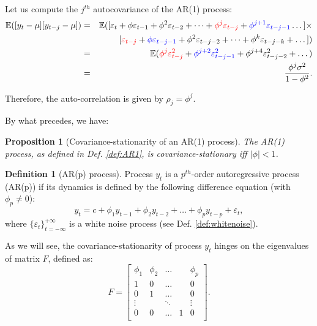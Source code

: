 \documentclass[
  11pt,
]{book}
\newtheorem{proposition}{Proposition}[chapter]
\theoremstyle{definition}
\newtheorem{definition}{Definition}[chapter]
\theoremstyle{definition}
\theoremstyle{definition}
\theoremstyle{definition}
\theoremstyle{remark}
\begin{document}
Let us compute the \(j^{th}\) autocovariance of the AR(1) process:
\begin{eqnarray*}
\mathbb{E}([y_{t} - \mu][y_{t-j} - \mu]) &=& \mathbb{E}([\varepsilon_t + \phi  \varepsilon_{t-1}+ \phi^2 \varepsilon_{t-2} + \dots + {\color{red}\phi^j \varepsilon_{t-j}} + {\color{blue}\phi^{j+1} \varepsilon_{t-j-1}} \dots]\times \\
&&[{\color{red}\varepsilon_{t-j}} + {\color{blue}\phi \varepsilon_{t-j-1}} + \phi^2 \varepsilon_{t-j-2} + \dots + \phi^k \varepsilon_{t-j-k} + \dots])\\
&=& \mathbb{E}({\color{red}\phi^j \varepsilon_{t-j}^2}+{\color{blue}\phi^{j+2} \varepsilon_{t-j-1}^2}+\phi^{j+4} \varepsilon_{t-j-2}^2+\dots)\\
&=& \frac{\phi^j \sigma^2}{1 - \phi^2}.
\end{eqnarray*}

Therefore, the auto-correlation is given by \(\rho_j = \phi^j\).

By what precedes, we have:

\begin{proposition}[Covariance-stationarity of an AR(1) process]
\protect\hypertarget{prp:statioAR1}{}\label{prp:statioAR1}The AR(1) process, as defined in Def. \ref{def:AR1}, is covariance-stationary iff \(|\phi|<1\).
\end{proposition}

\begin{definition}[AR(p) process]
\protect\hypertarget{def:ARp}{}\label{def:ARp}Process \(y_t\) is a \(p^{th}\)-order autoregressive process (AR(p)) if its dynamics is defined by the following difference equation (with \(\phi_p \ne 0\)):
\begin{equation}
y_t = c + \phi_1 y_{t-1} + \phi_2 y_{t-2} + \dots + \phi_p y_{t-p} + \varepsilon_t,\label{eq:AR}
\end{equation}
where \(\{\varepsilon_t\}_{t = -\infty}^{+\infty}\) is a white noise process (see Def. \ref{def:whitenoise}).
\end{definition}

As we will see, the covariance-stationarity of process \(y_t\) hinges on the eigenvalues of matrix \(F\), defined as:
\begin{equation}
F = \left[
\begin{array}{ccccc}
\phi_1 & \phi_2 & \dots& & \phi_p \\
1 & 0 &\dots && 0 \\
0 & 1 &\dots && 0 \\
\vdots &  & \ddots && \vdots \\
0 & 0 &\dots &1& 0 \\
\end{array}
\right].\label{eq:F}
\end{equation}
\end{document}
